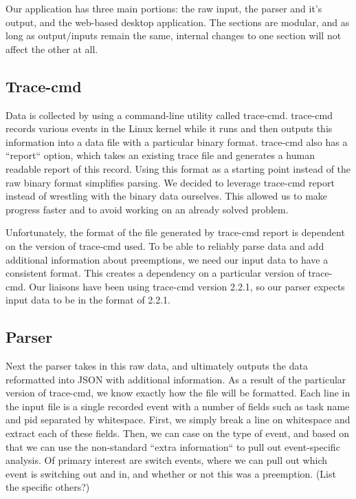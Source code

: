 \documentclass{hmcclinic}
\begin{document}
  Our application has three main portions: the raw input, the parser and it's
  output, and the web-based desktop application. The sections are modular, and
  as long as output/inputs remain the same, internal changes to one section will
  not affect the other at all.

  \subsection{Trace-cmd}

  Data is collected by using a command-line utility called trace-cmd.
  trace-cmd records various events in the Linux kernel while it runs and then
  outputs this information into a data file with a particular binary format.
  trace-cmd also has a ``report`` option, which takes an existing trace file and
  generates a human readable report of this record. Using this format as a
  starting point instead of the raw binary format simplifies parsing.  We
  decided to leverage trace-cmd report instead of wrestling with the binary data
  ourselves. This allowed us to make progress faster and to avoid working on an
  already solved problem.

   Unfortunately, the format of the file generated by trace-cmd report is
   dependent on the version of trace-cmd used. To be able to reliably parse data
   and add additional information about preemptions, we need our input data to
   have a consistent format. This creates a dependency on a particular version
   of trace-cmd. Our liaisons have been using trace-cmd version 2.2.1, so our
   parser expects input data to be in the format of 2.2.1.


  \subsection{Parser}
  Next the parser takes in this raw data, and ultimately outputs the data
  reformatted into JSON with additional information. As a result of the
  particular version of trace-cmd, we know exactly how the file will be
  formatted. Each line in the input file is a single recorded event with a
  number of fields such as task name and pid separated by whitespace. First, we
  simply break a line on whitespace and extract each of these fields. Then, we
  can case on the type of event, and based on that we can use the non-standard
  ``extra information`` to pull out event-specific analysis. Of primary interest
  are switch events, where we can pull out which event is switching out and in,
  and whether or not this was a preemption. (List the specific others?)
\end{document}
